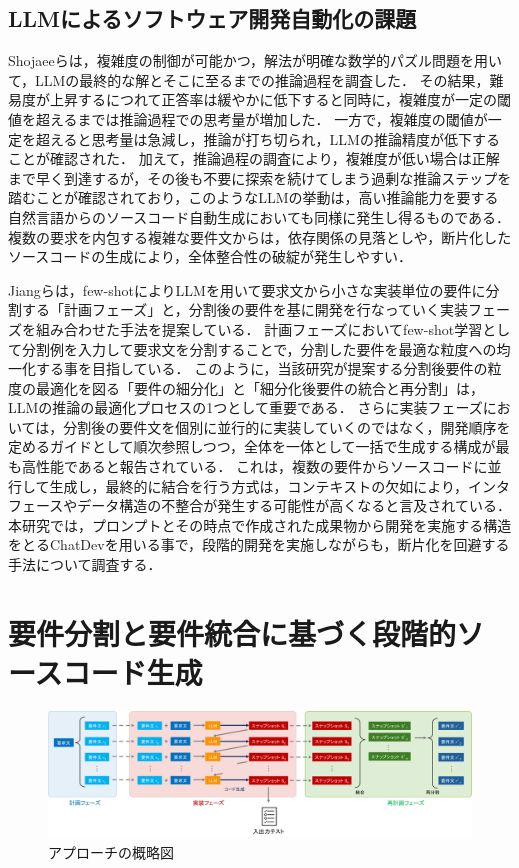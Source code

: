 \documentclass[submit,techrep,noauthor]{ipsj}
\begin{document}
\subsection{LLMによるソフトウェア開発自動化の課題}
Shojaeeら\cite{IllusionApple}は，複雑度の制御が可能かつ，解法が明確な数学的パズル問題を用いて，LLMの最終的な解とそこに至るまでの推論過程を調査した．
その結果，難易度が上昇するにつれて正答率は緩やかに低下すると同時に，複雑度が一定の閾値を超えるまでは推論過程での思考量が増加した．
一方で，複雑度の閾値が一定を超えると思考量は急減し，推論が打ち切られ，LLMの推論精度が低下することが確認された．
加えて，推論過程の調査により，複雑度が低い場合は正解まで早く到達するが，その後も不要に探索を続けてしまう過剰な推論ステップを踏むことが確認されており，このようなLLMの挙動は，高い推論能力を要する自然言語からのソースコード自動生成においても同様に発生し得るものである．
複数の要求を内包する複雑な要件文からは，依存関係の見落としや，断片化したソースコードの生成により，全体整合性の破綻が発生しやすい．

Jiangら\cite{tosem}は，few-shotによりLLMを用いて要求文から小さな実装単位の要件に分割する「計画フェーズ」と，分割後の要件を基に開発を行なっていく実装フェーズを組み合わせた手法を提案している．
計画フェーズにおいてfew-shot学習として分割例を入力して要求文を分割することで，分割した要件を最適な粒度への均一化する事を目指している．
このように，当該研究が提案する分割後要件の粒度の最適化を図る「要件の細分化」と「細分化後要件の統合と再分割」は，LLMの推論の最適化プロセスの1つとして重要である．
さらに実装フェーズにおいては，分割後の要件文を個別に並行的に実装していくのではなく，開発順序を定めるガイドとして順次参照しつつ，全体を一体として一括で生成する構成が最も高性能であると報告されている．
これは，複数の要件からソースコードに並行して生成し，最終的に結合を行う方式は，コンテキストの欠如により，インタフェースやデータ構造の不整合が発生する可能性が高くなると言及されている．
本研究では，プロンプトとその時点で作成された成果物から開発を実施する構造をとるChatDevを用いる事で，段階的開発を実施しながらも，断片化を回避する手法について調査する．


\section{要件分割と要件統合に基づく段階的ソースコード生成}
\label{sec:method}

\begin{figure}[t]
    \centering
    \includegraphics[width=1.0\linewidth]{./Toyoshima_fig/approach_abst_v3.pdf}
    \caption{アプローチの概略図}
    \label{approach_abst}
\end{figure}
\end{document}

